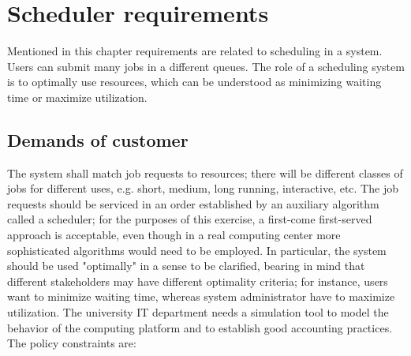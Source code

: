\chapter{Scheduler requirements} \label{sec:scheduler_requirements}
	Mentioned in this chapter requirements are related to scheduling in a system. Users can submit many jobs in a different queues. The role of a scheduling system is to optimally use resources, which can be understood as minimizing waiting time or maximize utilization. 
	
	\section{Demands of customer}
	\label{sec:scheduler_requirements_demands}
		The system shall match job requests to resources; there will be different classes of jobs for different uses, e.g. short, medium, long running, interactive, etc. The job requests should be serviced in an order established by an auxiliary algorithm called a scheduler; for the purposes of this exercise, a first-come first-served approach is acceptable, even though in a real computing center more sophisticated algorithms would need to be employed. In particular, the system should be used "optimally" in a sense to be clarified, bearing in mind that different stakeholders may have different optimality criteria; for instance, users want to minimize waiting time, whereas system administrator have to maximize utilization. The university IT department needs a simulation tool to model the behavior of the computing platform and to establish good accounting practices. The policy constraints are:
